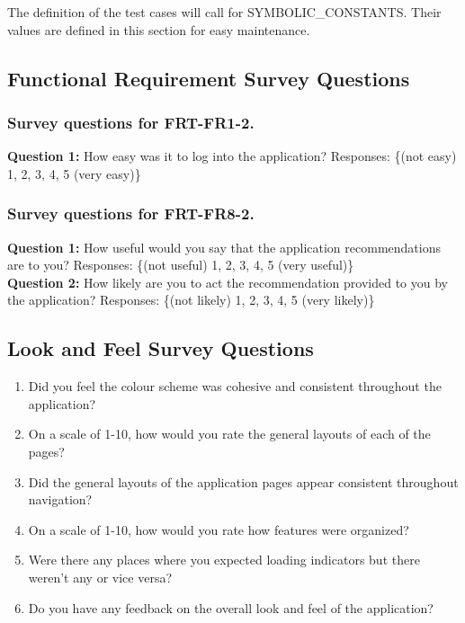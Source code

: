 \documentclass[12pt, titlepage]{article}
\begin{document}
The definition of the test cases will call for SYMBOLIC\_CONSTANTS.
Their values are defined in this section for easy maintenance.

\subsection{Functional Requirement Survey Questions}
\subsubsection{Survey questions for \textbf{FRT-FR1-2}.}

\noindent \textbf{Question 1:} How easy was it to log into the application?
Responses: \{(not easy) 1, 2, 3, 4, 5 (very easy)\} \\

\subsubsection{Survey questions for \textbf{FRT-FR8-2}.}

\noindent \textbf{Question 1:} How useful would you say that the application recommendations are to you?
Responses: \{(not useful) 1, 2, 3, 4, 5 (very useful)\} \\

\noindent \textbf{Question 2:} How likely are you to act the recommendation provided to you by the application?
Responses: \{(not likely) 1, 2, 3, 4, 5 (very likely)\}

\subsection{Look and Feel Survey Questions}

\begin{enumerate}
  \item Did you feel the colour scheme was cohesive and consistent throughout the application?
  \item On a scale of 1-10, how would you rate the general layouts of each of the pages?
  \item Did the general layouts of the application pages appear consistent throughout navigation?
  \item On a scale of 1-10, how would you rate how features were organized?
  \item Were there any places where you expected loading indicators but there weren't any or vice versa?
  \item Do you have any feedback on the overall look and feel of the application?
\end{enumerate}
\end{document}
